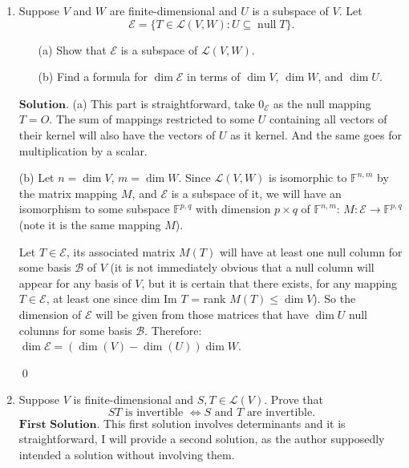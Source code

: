 \documentclass{article}
\theoremstyle{remark}
\begin{document}
\begin{enumerate}
        \item Suppose $V$ and $W$ are finite-dimensional and $U$ is a subspace of $V$. Let 
        \[
        \mathcal{E} = \{ T \in \mathcal{L}(V, W) \colon U \subseteq \operatorname{null} T \}.
        \]
        \begin{enumerate}
            \item[(a)] Show that $\mathcal{E}$ is a subspace of $\mathcal{L}(V, W)$.
            \item[(b)] Find a formula for $\dim \mathcal{E}$ in terms of $\dim V$, $\dim W$, and $\dim U$.
        \end{enumerate}
        $\textbf{Solution.}$ (a) This part is straightforward, take $0_{\mathcal{E}}$ as the null mapping $T = O$.
        The sum of mappings restricted to some $U$ containing all vectors of their kernel
        will also have the vectors of $U$ as it kernel. And the same goes for multiplication by a scalar.

        (b) Let $n = \dim V$, $m = \dim W$. Since $\mathcal{L}(V,W)$ is isomorphic to $\mathbb{F}^{n,m}$ by the matrix mapping $M$,
        and $\mathcal{E}$ is a subspace of it, we will have an isomorphism to some subspace $\mathbb{F}^{p,q}$ with dimension $p \times q$ of $\mathbb{F}^{n,m}$:
        $M: \mathcal{E} \to \mathbb{F}^{p,q}$ (note it is the same mapping $M$).
        
        Let $T \in \mathcal{E}$, its associated matrix $M(T)$ will have at least one null column for some basis $\mathcal{B}$ of $V$
        (it is not immediately obvious that a null column will appear for any basis of $V$, but it is certain that there exists, for any mapping $T \in \mathcal{E}$, at least one since dim Im $T$ = rank $M(T) \leq \dim V$).
        So the dimension of $\mathcal{E}$ will be given from those matrices that have $\dim U$ null columns for some basis $\mathcal{B}$.
        Therefore: $\dim \mathcal{E} = (\dim(V)-\dim(U))\dim W$.
        
        \begin{flushright}
            \qed
        \end{flushright}
        \item Suppose $V$ is finite-dimensional and $S, T \in \mathcal{L}(V)$. Prove that 
        \[
        ST \text{ is invertible } \iff S \text{ and } T \text{ are invertible.}
        \]
        $\textbf{First Solution.}$ This first solution involves determinants and it is straightforward,
        I will provide a second solution, as the author supposedly intended a solution without involving them.


\end{enumerate}
\end{document}
